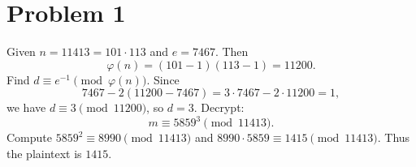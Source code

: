 \section*{Problem 1}

Given $n=11413=101\cdot 113$ and $e=7467$. Then
\[
\varphi(n)=(101-1)(113-1)=11200.
\]
Find $d\equiv e^{-1}\pmod{\varphi(n)}$. Since
\[
7467-2(11200-7467)=3\cdot 7467-2\cdot 11200=1,
\]
we have $d\equiv 3\pmod{11200}$, so $d=3$. Decrypt:
\[
m\equiv 5859^3 \pmod{11413}.
\]
Compute $5859^2\equiv 8990\pmod{11413}$ and $8990\cdot 5859\equiv \boxed{1415}\pmod{11413}$.
Thus the plaintext is $\boxed{1415}$.
